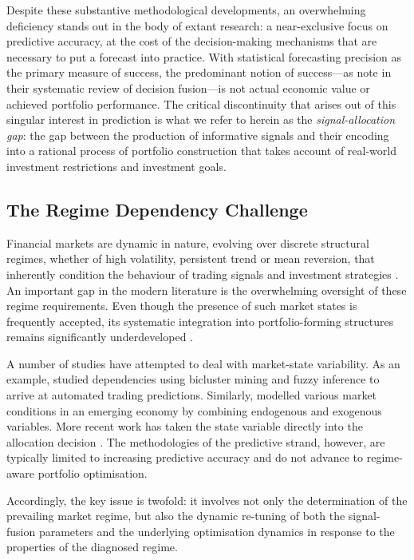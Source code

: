 \documentclass{singlecol-new}
\theoremstyle{TH}{
\newtheorem{lemma}{Lemma}
\newtheorem{theorem}[lemma]{Theorem}
\newtheorem{corrolary}[lemma]{Corrolary}
\newtheorem{conjecture}[lemma]{Conjecture}
\newtheorem{proposition}[lemma]{Proposition}
\newtheorem{claim}[lemma]{Claim}
\newtheorem{stheorem}[lemma]{Wrong Theorem}
\newtheorem{algorithm}{Algorithm}
}
\theoremstyle{THrm}{
\newtheorem{definition}{Definition}[section]
\newtheorem{question}{Question}[section]
\newtheorem{remark}{Remark}
\newtheorem{scheme}{Scheme}
}
\theoremstyle{THhit}{
\newtheorem{case}{Case}[section]
}
\begin{document}
Despite these substantive methodological developments, an overwhelming deficiency stands
out in the body of extant research: a near-exclusive focus on predictive accuracy, at the
cost of the decision-making mechanisms that are necessary to put a forecast into
practice. With statistical forecasting precision as the primary measure of success, the
predominant notion of success---as \citet{zhang22} note in their systematic review of
decision fusion---is not actual economic value or achieved portfolio performance. The
critical discontinuity that arises out of this singular interest in prediction is what we
refer to herein as the \emph{signal-allocation gap}: the gap between the production of
informative signals and their encoding into a rational process of portfolio construction
that takes account of real-world investment restrictions and investment goals.

\subsection{The Regime Dependency Challenge}

Financial markets are dynamic in nature, evolving over discrete structural regimes,
whether of high volatility, persistent trend or mean reversion, that inherently
condition the behaviour of trading signals and investment strategies \citep{wang19}. An
important gap in the modern literature is the overwhelming oversight of these regime
requirements. Even though the presence of such market states is frequently accepted, its
systematic integration into portfolio-forming structures remains significantly
underdeveloped \citep{kritzman12}.

A number of studies have attempted to deal with market-state variability. As an example,
\citet{huang20} studied dependencies using bicluster mining and fuzzy inference to arrive
at automated trading predictions. Similarly, \citet{alsheebah24} modelled various market
conditions in an emerging economy by combining endogenous and exogenous variables. More
recent work has taken the state variable directly into the allocation decision
\citep{li25,luo26}. The methodologies of the predictive strand, however, are typically
limited to increasing predictive accuracy and do not advance to regime-aware portfolio
optimisation.

Accordingly, the key issue is twofold: it involves not only the determination of the
prevailing market regime, but also the dynamic re-tuning of both the signal-fusion
parameters and the underlying optimisation dynamics in response to the properties of the
diagnosed regime.
\end{document}
